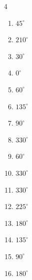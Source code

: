 \begin{multicols}{4}
\begin{enumerate}
  \item $\displaystyle 45^{\circ}$

  \item $\displaystyle 210^{\circ}$

  \item $\displaystyle 30^{\circ}$

  \item $\displaystyle 0^{\circ}$
        \phantom{$\displaystyle =0$}

  \item $\displaystyle 60^{\circ}$

  \item $\displaystyle 135^{\circ}$

  \item $\displaystyle 90^{\circ}$

  \item $\displaystyle 330^{\circ}$

  \item $\displaystyle 60^{\circ}$

  \item $\displaystyle 330^{\circ}$

\columnbreak %

\resetques

  \item $\displaystyle 330^{\circ}$

  \item $\displaystyle 225^{\circ}$

  \item $\displaystyle 180^{\circ}$
        \phantom{$\displaystyle =\pi$}

  \item $\displaystyle 135^{\circ}$

  \item $\displaystyle 90^{\circ}$

  \item $\displaystyle 180^{\circ}$
        \phantom{$\displaystyle =\pi$}


\end{enumerate}
\end{multicols}
